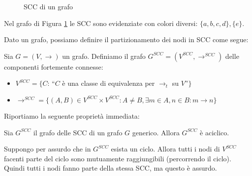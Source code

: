 \begin{example}
    \begin{figure}[b]
        \centering
        \caption{SCC di un grafo}
        \label{fig:graph_cfc_1}
    \end{figure}
    Nel grafo di Figura \ref*{fig:graph_cfc_1} le SCC sono evidenziate con colori diversi: $\{a,b,c,d\}, \{e\}$.
\end{example}
Dato un grafo, possiamo definire il partizionamento dei nodi in SCC come segue:
\begin{definition}
    Sia $G = (V, \to)$ un grafo. Definiamo il grafo $G^{SCC} = (V^{SCC}, \to^{SCC})$ delle componenti fortemente connesse:
    \begin{itemize}
        \item $V^{SCC} = \{C : \,$``$C$ è una classe di equivalenza per $\to_t$ su $V$''$\}$
        \item $\to^{SCC} = \{(A,B) \in V^{SCC} \times V^{SCC} : A \neq B, \exists m \in A, n \in B : m \to n\}$
    \end{itemize}
\end{definition}
Riportiamo la seguente proprietà immediata:
\begin{proposition}
    Sia $G^{SCC}$ il grafo delle SCC di un grafo $G$ generico. Allora $G^{SCC}$ è aciclico.
\end{proposition}
\begin{proof2}
    Suppongo per assurdo che in $G^{SCC}$ esista un ciclo. Allora tutti i nodi di $V^{SCC}$ facenti parte del ciclo sono mutuamente raggiungibili (percorrendo il ciclo). Quindi tutti i nodi fanno parte della stessa SCC, ma questo è assurdo.
\end{proof2}
